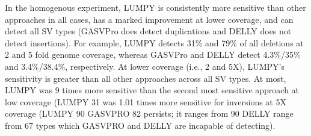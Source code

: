 \documentclass[10pt]{bmc_article}
\def\texttt{[image: ]}
\newenvironment{bmcformat}{\begin{raggedright}\baselineskip20pt\sloppy\setboolean{publ}{false}}{\end{raggedright}\baselineskip20pt\sloppy}
\begin{document}
\begin{bmcformat}
In the homogenous experiment, LUMPY is consistently more sensitive than other
approaches in all cases, has a marked improvement at lower coverage, and can
detect all SV types (GASVPro does detect duplications and DELLY does not detect
insertions).   For example, LUMPY detects 31\% and 79\% of all deletions at 2
and 5 fold genome coverage, whereas GASVPro and DELLY detect 4.3\%/35\% and
3.4\%/38.4\%, respectively.  At lower coverage (i.e., 2 and 5X), LUMPY’s
sensitivity is greater than all other approaches across all SV types. At most,
LUMPY was 9 times more sensitive than the second most sensitive approach at low
coverage (LUMPY 31%
was 1.01 times more sensitive for inversions at 5X coverage (LUMPY 90%
GASVPRO 82%
persists; it ranges from 90%
DELLY range from 67%
types which GASVPRO and DELLY are incapable of detecting).  





\end{bmcformat}
\end{document}
